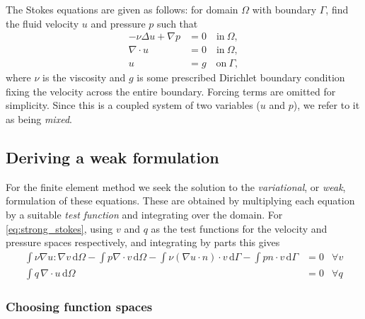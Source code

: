 \documentclass[thesis]{subfiles}
\begin{document}
The Stokes equations are given as follows: for domain $\Omega$ with boundary $\Gamma$, find the fluid velocity $u$ and pressure $p$ such that
\begin{equation} \label{eq:strong_stokes}
  \begin{aligned}
    - \nu \Delta u + \nabla p &= 0 \quad \textrm{in} \ \Omega, \\
    \nabla \cdot u &= 0 \quad \textrm{in} \ \Omega, \\
    u &= g \quad \textrm{on} \ \Gamma,
  \end{aligned}
\end{equation}
where $\nu$ is the viscosity and $g$ is some prescribed Dirichlet boundary condition fixing the velocity across the entire boundary.
Forcing terms are omitted for simplicity.
Since this is a coupled system of two variables ($u$ and $p$), we refer to it as being \emph{mixed}.

\subsection{Deriving a weak formulation}

For the finite element method we seek the solution to the \emph{variational}, or \emph{weak}, formulation of these equations.
These are obtained by multiplying each equation by a suitable \emph{test function} and integrating over the domain.
For \cref{eq:strong_stokes}, using $v$ and $q$ as the test functions for the velocity and pressure spaces respectively, and integrating by parts this gives
\begin{equation} \label{eq:weak_stokes_full}
  \begin{aligned}
    \int \nu \nabla u : \nabla v \, \textrm{d}\Omega
    - \int p \nabla \cdot v \, \textrm{d}\Omega
    - \int \nu (\nabla u \cdot n) \cdot v \, \textrm{d}\Gamma
    - \int p n \cdot v \, \textrm{d}\Gamma
    &= 0
    &\forall v
    \\
    \int q \, \nabla \cdot u \, \textrm{d}\Omega
    &= 0
    &\forall q
  \end{aligned}
\end{equation}

\subsubsection{Choosing function spaces}
\end{document}
